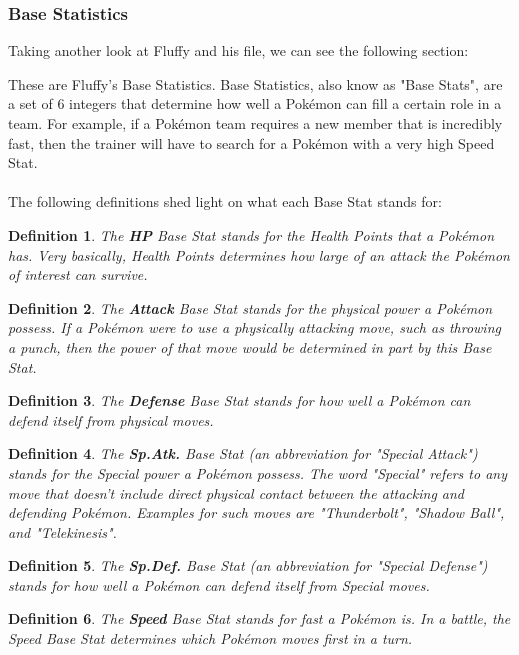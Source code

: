 \documentclass{article}
\newtheorem{definition}{Definition}
\begin{document}
\subsubsection{Base Statistics}
Taking another look at Fluffy and his file, we can see the following section:
\begin{center}
\end{center}
These are Fluffy's Base Statistics. Base Statistics, also know as "Base Stats", are a set of 6 integers that determine how well a Pok\'emon can fill a certain role in a team. For example, if a Pok\'emon team requires a new member that is incredibly fast, then the trainer will have to search for a Pok\'emon with a very high Speed Stat. \\\\
The following definitions shed light on what each Base Stat stands for:
\begin{definition}
	The \textbf{HP} Base Stat stands for the Health Points that a Pok\'emon has. Very basically, Health Points determines how large of an attack the Pok\'emon of interest can survive.
\end{definition}
\begin{definition}
	The \textbf{Attack} Base Stat stands for the physical power a Pok\'emon possess. If a Pok\'emon were to use a physically attacking move, such as throwing a punch, then the power of that move would be determined in part by this Base Stat. 
\end{definition}
\begin{definition}
	The \textbf{Defense} Base Stat stands for how well a Pok\'emon can defend itself from physical moves. 
\end{definition}
\begin{definition}
	The \textbf{Sp.Atk.} Base Stat (an abbreviation for "Special Attack") stands for the Special power a Pok\'emon possess. The word "Special" refers to any move that doesn't include direct physical contact between the attacking and defending Pok\'emon. Examples for such moves are "Thunderbolt", "Shadow Ball", and "Telekinesis".
\end{definition}
\begin{definition}
	The \textbf{Sp.Def.} Base Stat (an abbreviation for "Special Defense") stands for how well a Pok\'emon can defend itself from Special moves. 
\end{definition}
\begin{definition}
	The \textbf{Speed} Base Stat stands for fast a Pok\'emon is. In a battle, the Speed Base Stat determines which Pok\'emon moves first in a turn.
\end{definition}
\end{document}
